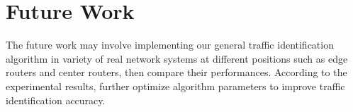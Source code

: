 \documentclass[master]{thesis}
\begin{document}
\section{Future Work}

The future work may involve implementing our general traffic identification algorithm in variety of real network systems at different positions such as edge routers and center routers, then compare their performances. According to the experimental results, further optimize algorithm parameters to improve traffic identification accuracy.  


\backmatter %




\appendix %

\end{document}
